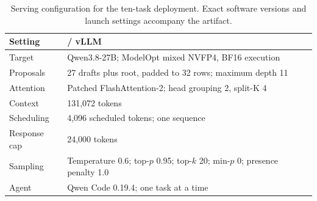 \begin{table}[!htbp]
\caption{Serving configuration for the ten-task \sys{} deployment. Exact software versions and launch settings accompany the artifact.}
\label{tab:serving-config}
\centering\footnotesize
\renewcommand{\arraystretch}{1.12}
\begin{tabularx}{\columnwidth}{@{}>{\raggedright\arraybackslash}p{}Y@{}}
\toprule
Setting & \sys{} / vLLM \\
\midrule
Target & Qwen3.8-27B; ModelOpt mixed NVFP4, BF16 execution \\
Proposals & 27 drafts plus root, padded to 32 rows; maximum depth 11 \\
Attention & Patched FlashAttention-2; head grouping 2, split-K 4 \\
Context & 131,072 tokens \\
Scheduling & 4,096 scheduled tokens; one sequence \\
Response cap & 24,000 tokens \\
Sampling & Temperature 0.6; top-$p$ 0.95; top-$k$ 20; min-$p$ 0; presence penalty 1.0 \\
Agent & Qwen Code 0.19.4; one task at a time \\
\bottomrule
\end{tabularx}
\end{table}
